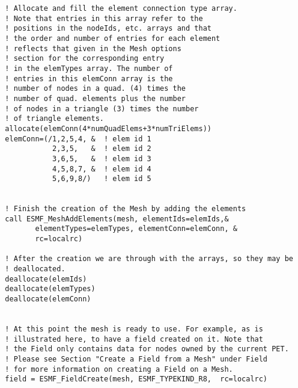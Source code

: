 \begin{verbatim}
  ! Allocate and fill the element connection type array.
  ! Note that entries in this array refer to the 
  ! positions in the nodeIds, etc. arrays and that
  ! the order and number of entries for each element
  ! reflects that given in the Mesh options 
  ! section for the corresponding entry
  ! in the elemTypes array. The number of 
  ! entries in this elemConn array is the
  ! number of nodes in a quad. (4) times the 
  ! number of quad. elements plus the number
  ! of nodes in a triangle (3) times the number
  ! of triangle elements. 
  allocate(elemConn(4*numQuadElems+3*numTriElems))
  elemConn=(/1,2,5,4, &  ! elem id 1
             2,3,5,   &  ! elem id 2
             3,6,5,   &  ! elem id 3
             4,5,8,7, &  ! elem id 4
             5,6,9,8/)   ! elem id 5


  ! Finish the creation of the Mesh by adding the elements
  call ESMF_MeshAddElements(mesh, elementIds=elemIds,&
         elementTypes=elemTypes, elementConn=elemConn, &
         rc=localrc)

  ! After the creation we are through with the arrays, so they may be
  ! deallocated.
  deallocate(elemIds)
  deallocate(elemTypes)
  deallocate(elemConn)


  ! At this point the mesh is ready to use. For example, as is 
  ! illustrated here, to have a field created on it. Note that 
  ! the Field only contains data for nodes owned by the current PET.
  ! Please see Section "Create a Field from a Mesh" under Field
  ! for more information on creating a Field on a Mesh. 
  field = ESMF_FieldCreate(mesh, ESMF_TYPEKIND_R8,  rc=localrc)

 
\end{verbatim}
 

